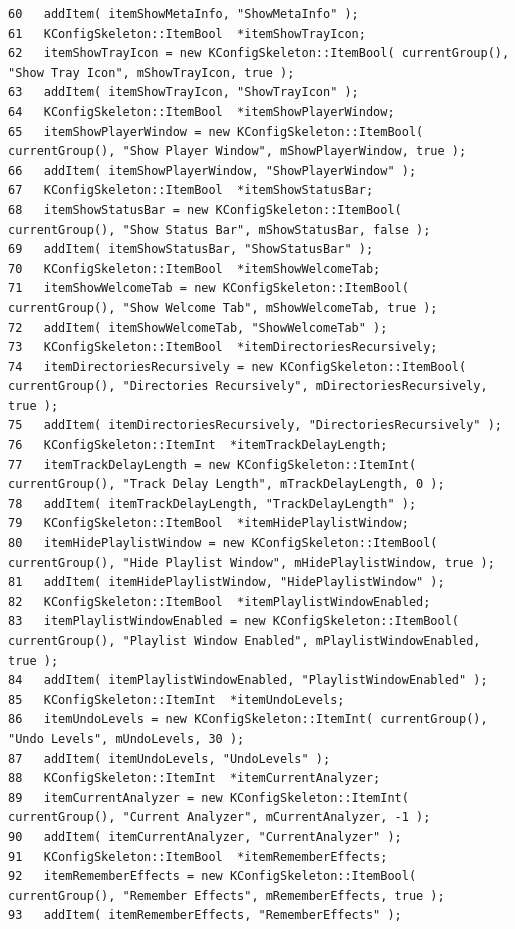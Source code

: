 \begin{verbatim}
60   addItem( itemShowMetaInfo, "ShowMetaInfo" );
61   KConfigSkeleton::ItemBool  *itemShowTrayIcon;
62   itemShowTrayIcon = new KConfigSkeleton::ItemBool( currentGroup(), "Show Tray Icon", mShowTrayIcon, true );
63   addItem( itemShowTrayIcon, "ShowTrayIcon" );
64   KConfigSkeleton::ItemBool  *itemShowPlayerWindow;
65   itemShowPlayerWindow = new KConfigSkeleton::ItemBool( currentGroup(), "Show Player Window", mShowPlayerWindow, true );
66   addItem( itemShowPlayerWindow, "ShowPlayerWindow" );
67   KConfigSkeleton::ItemBool  *itemShowStatusBar;
68   itemShowStatusBar = new KConfigSkeleton::ItemBool( currentGroup(), "Show Status Bar", mShowStatusBar, false );
69   addItem( itemShowStatusBar, "ShowStatusBar" );
70   KConfigSkeleton::ItemBool  *itemShowWelcomeTab;
71   itemShowWelcomeTab = new KConfigSkeleton::ItemBool( currentGroup(), "Show Welcome Tab", mShowWelcomeTab, true );
72   addItem( itemShowWelcomeTab, "ShowWelcomeTab" );
73   KConfigSkeleton::ItemBool  *itemDirectoriesRecursively;
74   itemDirectoriesRecursively = new KConfigSkeleton::ItemBool( currentGroup(), "Directories Recursively", mDirectoriesRecursively, true );
75   addItem( itemDirectoriesRecursively, "DirectoriesRecursively" );
76   KConfigSkeleton::ItemInt  *itemTrackDelayLength;
77   itemTrackDelayLength = new KConfigSkeleton::ItemInt( currentGroup(), "Track Delay Length", mTrackDelayLength, 0 );
78   addItem( itemTrackDelayLength, "TrackDelayLength" );
79   KConfigSkeleton::ItemBool  *itemHidePlaylistWindow;
80   itemHidePlaylistWindow = new KConfigSkeleton::ItemBool( currentGroup(), "Hide Playlist Window", mHidePlaylistWindow, true );
81   addItem( itemHidePlaylistWindow, "HidePlaylistWindow" );
82   KConfigSkeleton::ItemBool  *itemPlaylistWindowEnabled;
83   itemPlaylistWindowEnabled = new KConfigSkeleton::ItemBool( currentGroup(), "Playlist Window Enabled", mPlaylistWindowEnabled, true );
84   addItem( itemPlaylistWindowEnabled, "PlaylistWindowEnabled" );
85   KConfigSkeleton::ItemInt  *itemUndoLevels;
86   itemUndoLevels = new KConfigSkeleton::ItemInt( currentGroup(), "Undo Levels", mUndoLevels, 30 );
87   addItem( itemUndoLevels, "UndoLevels" );
88   KConfigSkeleton::ItemInt  *itemCurrentAnalyzer;
89   itemCurrentAnalyzer = new KConfigSkeleton::ItemInt( currentGroup(), "Current Analyzer", mCurrentAnalyzer, -1 );
90   addItem( itemCurrentAnalyzer, "CurrentAnalyzer" );
91   KConfigSkeleton::ItemBool  *itemRememberEffects;
92   itemRememberEffects = new KConfigSkeleton::ItemBool( currentGroup(), "Remember Effects", mRememberEffects, true );
93   addItem( itemRememberEffects, "RememberEffects" );

\end{verbatim}
